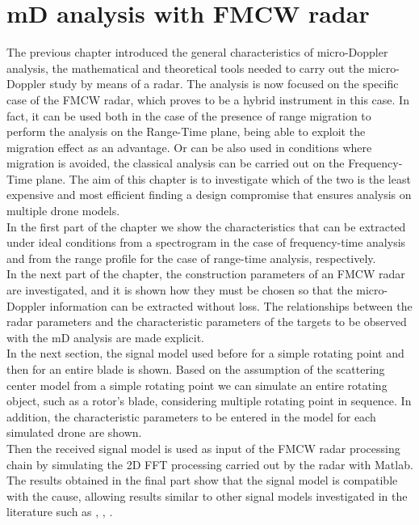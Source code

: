\chapter{mD analysis with FMCW radar}
The previous chapter introduced the general characteristics of micro-Doppler analysis, the mathematical and theoretical tools needed to carry out the micro-Doppler study by means of a radar. The analysis is now focused on the specific case of the FMCW radar, which proves to be a hybrid instrument in this case. In fact, it can be used both in the case of the presence of range migration to perform the analysis on the Range-Time plane, being able to exploit the migration effect as an advantage. Or can be also used in conditions where migration is avoided, the classical analysis can be carried out on the Frequency-Time plane. The aim of this chapter is to investigate which of the two is the least expensive and most efficient finding a design compromise that ensures analysis on multiple drone models.\\
In the first part of the chapter we show the characteristics that can be extracted under ideal conditions from a spectrogram in the case of frequency-time analysis and from the range profile for the case of range-time analysis, respectively.\\
In the next part of the chapter, the construction parameters of an FMCW radar are investigated, and it is shown how they must be chosen so that the micro-Doppler information can be extracted without loss. The relationships between the radar parameters and the characteristic parameters of the targets to be observed with the mD analysis are made explicit. \\
In the next section, the signal model used before for a simple rotating point and then for an entire blade is shown. Based on the assumption of the scattering center model from a simple rotating point we can simulate an entire rotating object, such as a rotor's blade, considering multiple rotating point in sequence. In addition, the characteristic parameters to be entered in the model for each simulated drone are shown.\\
Then the received signal model is used as input of the FMCW radar processing chain by simulating the 2D FFT processing carried out by the radar with Matlab. The results obtained in the final part show that the signal model is compatible with the cause, allowing results similar to other signal models investigated in the literature such as \cite{microdoppler_chen}, \cite{kulpa}, \cite{MartinMulgrew}.\\
